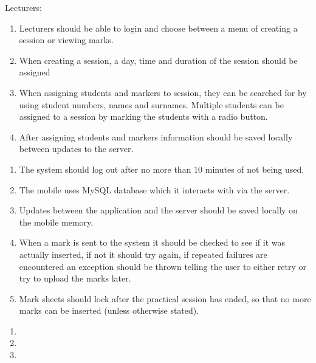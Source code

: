\documentclass{article}
\begin{document}
\noindent 

\noindent Lecturers: 

\begin{enumerate}
\item  Lecturers should be able to login and choose between a menu of creating a session or viewing marks.

\item  When creating a session, a day, time and duration of the session should be assigned

\item  When assigning students and markers to session, they can be searched for by using student numbers, names and surnames. Multiple students can be assigned to a session by marking the students with a radio button.

\item  After assigning students and markers information should be saved locally between updates to the server.
\end{enumerate}

\noindent 

\noindent 

\begin{enumerate}
\item  The system should log out after no more than 10 minutes of not being used. 

\item  The mobile uses MySQL database which it interacts with via the server. 

\item  Updates between the application and the server should be saved locally on the mobile memory.

\item  When a mark is sent to the system it should be checked to see if it was actually inserted, if not it should try again, if repeated failures are encountered an exception should be thrown telling the user to either retry or try to upload the marks later. 

\item  Mark sheets should lock after the practical session has ended, so that no more marks can be inserted (unless otherwise stated). 
\end{enumerate}

\noindent 

\begin{enumerate}
\item  

\item  

\item  
\end{enumerate}
\end{document}
